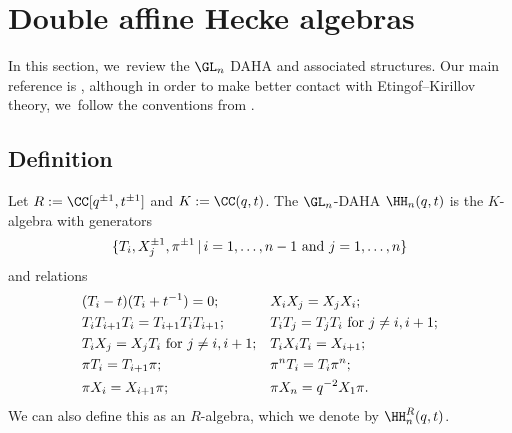 \section{Double affine Hecke algebras}

In this section, we~review the $\GL_n$ DAHA and associated structures.
Our main reference is \cite{ChereDAHA}, although in order to make better contact with Etingof--Kirillov theory, we~follow the conventions from \cite{KirLec}.

\subsection{Definition}
Let $R:=\CC[q^{\pm1},t^{\pm1}]$ and $K:=\CC(q,t)$.
The $\GL_n$-DAHA $\HH_n(q,t)$ is the $K$-algebra with generators
\[
\{T_i,
X_j^{\pm 1},
\pi^{\pm 1}\, |\,i=1,\ldots, n-1\hbox{ and } j=1,\ldots, n\}
\]
and relations
\begin{equation*}
\begin{aligned}
&(T_i-t)(T_i+t^{-1})=0;&&X_iX_j=X_jX_i; \\
&T_iT_{i+1}T_i=T_{i+1}T_iT_{i+1};&& T_iT_j=T_jT_i\hbox{ for }j\not=i, i+1;\\
&T_iX_j=X_jT_i\hbox{ for }j\not=i, i+1; && T_iX_iT_i=X_{i+1}; \\
&\pi T_i=T_{i+1}\pi; && \pi^n T_i=T_i\pi^n;\\
&\pi X_i=X_{i+1}\pi;&& \pi X_n=q^{-2}X_1\pi.
\end{aligned}
\end{equation*}
We can also define this as an $R$-algebra, which we denote by $\HH^R_n(q,t)$.

